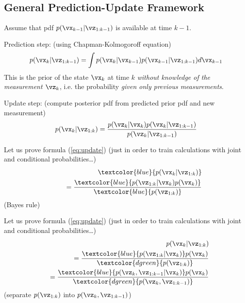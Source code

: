 \documentclass[english,pdftex]{article}
\begin{document}
\newpage
\subsection{General Prediction-Update Framework}

Assume that pdf $p(\vx_{k-1}|\vz_{1:k-1})$ is available at time
$k-1$.

Prediction step: (using Chapman-Kolmogoroff equation)
\begin{equation}
 \label{eq:predict}
  p(\vx_k|\vz_{1:k-1}) = \int
  p(\vx_k|\vx_{k-1}) p(\vx_{k-1}|\vz_{1:k-1}) d\vx_{k-1}
\end{equation}
This is the prior of the state $\vx_k$ at time $k$ \emph{without
knowledge of the measurement $\vz_k$}, i.e. the probability
\emph{given only previous measurements}.

Update step: (compute posterior pdf from
predicted prior pdf and new measurement)
\begin{equation}
 \label{eq:update}
  p(\vx_k|\vz_{1:k}) = \frac{p(\vz_k|\vx_k)p(\vx_k|\vz_{1:k-1})}{p(\vz_{k}|\vz_{1:k-1})}
\end{equation}





\newpage
{}

\def\temp{Let us prove formula (\ref{eq:update}) (just in order to train calculations
with joint and conditional probabilities\dots)}
\temp
\begin{eqnarray*}
    && \hspace*{75mm} \\[-5mm]
    && \textcolor{blue}{p(\vx_k|\vz_{1:k})} \\
    &&= \frac{\textcolor{blue}{p(\vz_{1:k}|\vx_k)p(\vx_k)}}{\textcolor{blue}{p(\vz_{1:k})}}
\end{eqnarray*}
(Bayes rule)


\newpage
\temp
\begin{eqnarray*}
    && \hspace*{75mm} \\[-5mm]
    && p(\vx_k|\vz_{1:k}) \\
    &&= \frac{\textcolor{blue}{p(\vz_{1:k}|\vx_k)}p(\vx_k)}{\textcolor{dgreen}{p(\vz_{1:k})}} \\
    &&= \frac{\textcolor{blue}{p(\vz_{k},\vz_{1:k-1}|\vx_k)}p(\vx_k)}{\textcolor{dgreen}{p(\vz_{k},\vz_{1:k-1})}}
\end{eqnarray*}
(separate $p(\vz_{1:k})$ into $p(\vz_k,\vz_{1:k-1})$)
\end{document}

